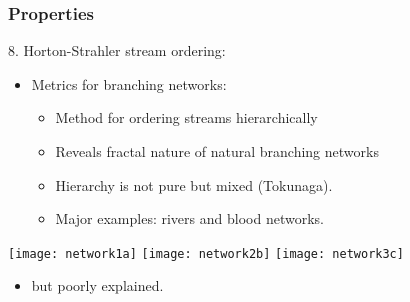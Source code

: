 \begin{frame}
  \frametitle{Properties}

  \begin{block}{8. Horton-Strahler stream ordering:}
    \begin{itemize}
    \item<1-> Metrics for branching networks:
      \begin{itemize}
      \item<2-> 
        Method for ordering streams hierarchically
      \item<3->
        Reveals fractal nature of natural branching networks
      \item<4->
        Hierarchy is not pure but mixed (Tokunaga).\cite{tokunaga1966a,dodds1999a}
      \item<5->
        Major examples: rivers and blood networks.
      \end{itemize}
    \end{itemize}
  \end{block}
  \begin{overprint}
    \begin{center}
      \texttt{[image: network1a]}%
      \texttt{[image: network2b]} 
      \texttt{[image: network3c]}%
    \end{center}
  \end{overprint}
  \begin{itemize}
  \item<6->  but \alert{poorly explained}.
  \end{itemize}

\end{frame}

